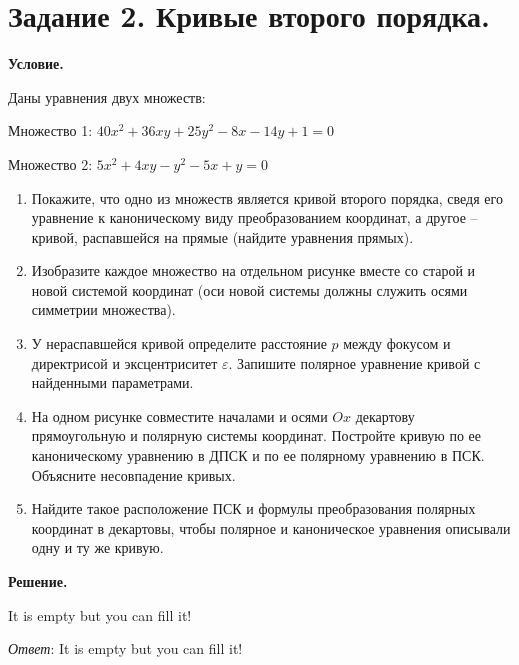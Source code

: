 \section{Задание 2. Кривые второго порядка.}

\textbf{Условие.}

Даны уравнения двух множеств:

Множество 1: $40x^2 + 36xy + 25y^2 - 8x - 14y + 1 = 0$

Множество 2: $5x^2 + 4xy - y^2 - 5x + y = 0$

\begin{enumerate}
    \item Покажите, что одно из множеств является кривой второго порядка, сведя его
уравнение к каноническому виду преобразованием координат, а другое – кривой,
распавшейся на прямые (найдите уравнения прямых).
    \item Изобразите каждое множество на отдельном рисунке вместе со старой и новой
системой координат (оси новой системы должны служить осями симметрии
множества).
    \item У нераспавшейся кривой определите расстояние $p$ между фокусом и директрисой и
эксцентриситет $\varepsilon$. Запишите полярное уравнение кривой с найденными параметрами.
    \item На одном рисунке совместите началами и осями $Ox$ декартову прямоугольную и
полярную системы координат. Постройте кривую по ее каноническому уравнению в
ДПСК и по ее полярному уравнению в ПСК. Объясните несовпадение кривых.
    \item Найдите такое расположение ПСК и формулы преобразования полярных координат в
декартовы, чтобы полярное и каноническое уравнения описывали одну и ту же
кривую.
\end{enumerate}
\vspace{10mm}
\textbf{Решение.}

It is empty but you can fill it!

\textit{Ответ}:  It is empty but you can fill it!
\clearpage